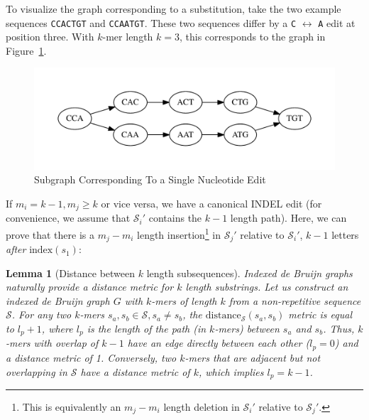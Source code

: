 \documentclass[phd]{ucbthesis}
\newtheorem{lemma}{Lemma}
\begin{document}
To visualize the graph corresponding to a substitution, take the two example sequences \texttt{CCACTGT}
and \texttt{CCAATGT}. These two sequences differ by a \texttt{C} $\leftrightarrow$ \texttt{A} edit at
position three. With $k$-mer length $k = 3$, this corresponds to the graph in Figure~\ref{fig:sne}.

\begin{figure}[h]
\begin{center}
\includegraphics[width=0.95\linewidth, clip=true, trim=0 39 0 39]{graphs/sne.pdf}
\end{center}
\caption{Subgraph Corresponding To a Single Nucleotide Edit}
\label{fig:sne}
\end{figure}

If $m_i = k - 1, m_j \ge k$ or vice versa, we have a canonical INDEL edit (for convenience, we assume
that $\mathcal{S}_i'$ contains the $k - 1$ length path). Here, we can prove that there is a $m_j - m_i$
length insertion\footnote{This is equivalently an $m_j - m_i$ length deletion in $\mathcal{S}_i'$ relative to
$\mathcal{S}_j'$.} in $\mathcal{S}_j'$ relative to $\mathcal{S}_i'$, $k - 1$ letters \emph{after}
$\text{index}(s_1)$:

\begin{lemma}[Distance between $k$ length subsequences]
\label{lem:minimum-distance}
\emph{Indexed de Bruijn} graphs naturally provide a distance metric for $k$ length substrings. Let us construct an
indexed de Bruijn graph $G$ with $k$-mers of length $k$ from a non-repetitive sequence $\mathcal{S}$.
For any two $k$-mers $s_a, s_b \in \mathcal{S}, s_a \ne s_b$, the
$\text{distance}_\mathcal{S}(s_a, s_b)$ metric is equal to $l_p + 1$, where $l_p$ is the length of the
path (in $k$-mers) between $s_a$ and $s_b$. Thus, $k$-mers with overlap of $k - 1$ have an edge
directly between each other ($l_p = 0$) and a distance metric of 1. Conversely, two $k$-mers that are
adjacent but not overlapping in $\mathcal{S}$ have a distance metric of $k$, which implies $l_p = k - 1$.
\end{lemma}
\end{document}
